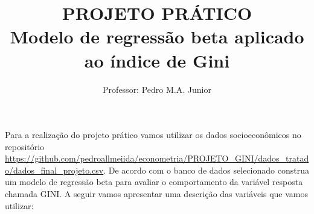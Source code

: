 \documentclass[thmsa,11pt]{article}
\begin{document}
\author{Professor: Pedro M.A. Junior}
\title{PROJETO PRÁTICO \\ Modelo de regressão beta aplicado ao índice de Gini}


\maketitle


Para a realização do projeto prático vamos utilizar os dados socioeconômicos no repositório \url{https://github.com/pedroallmeiida/econometria/PROJETO_GINI/dados_tratado/dados_final_projeto.csv}. 
De acordo com o banco de dados selecionado construa um modelo de regressão beta para avaliar o comportamento da variável resposta chamada GINI. A seguir vamos apresentar uma descrição das variáveis que vamos utilizar: 
\end{document}
